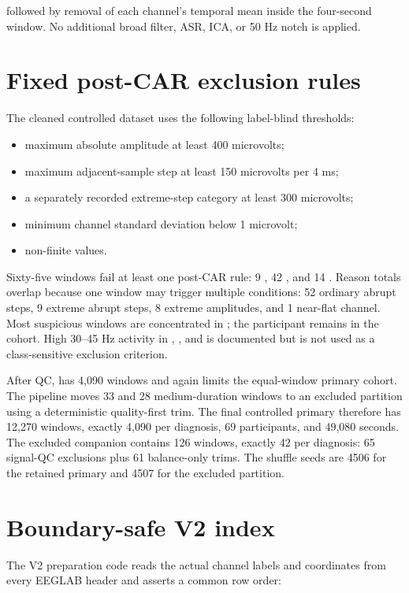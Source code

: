 followed by removal of each channel's temporal mean inside the four-second
window. No additional broad filter, ASR, ICA, or 50 Hz notch is applied.

\section{Fixed post-CAR exclusion rules}

The cleaned controlled dataset uses the following label-blind thresholds:

\begin{itemize}
  \item maximum absolute amplitude at least 400 microvolts;
  \item maximum adjacent-sample step at least 150 microvolts per 4 ms;
  \item a separately recorded extreme-step category at least 300 microvolts;
  \item minimum channel standard deviation below 1 microvolt;
  \item non-finite values.
\end{itemize}

Sixty-five windows fail at least one post-CAR rule: 9 \AD{}, 42 \FTD{}, and 14
\CN{}. Reason totals overlap because one window may trigger multiple conditions:
52 ordinary abrupt steps, 9 extreme abrupt steps, 8 extreme amplitudes, and 1
near-flat channel. Most suspicious \FTD{} windows are concentrated in
; the participant remains in the cohort. High 30--45 Hz activity
in , , and  is documented but is not
used as a class-sensitive exclusion criterion.

After QC, \FTD{} has 4,090 windows and again limits the equal-window primary
cohort. The pipeline moves 33 \AD{} and 28 \CN{} medium-duration windows to an
excluded partition using a deterministic quality-first trim. The final
controlled primary therefore has 12,270 windows, exactly 4,090 per diagnosis,
69 participants, and 49,080 seconds. The excluded companion contains 126
windows, exactly 42 per diagnosis: 65 signal-QC exclusions plus 61 balance-only
trims. The shuffle seeds are 4506 for the retained primary and 4507 for the
excluded partition.

\section{Boundary-safe V2 index}

The V2 preparation code reads the actual channel labels and coordinates from
every EEGLAB header and asserts a common row order:

